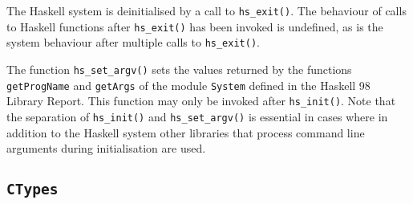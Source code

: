 \documentclass[a4paper,twoside]{article}
\newcommand{\code}[1]{\texttt{#1}}      %
\begin{document}
The Haskell system is deinitialised by a call to \code{hs\_exit()}.  The
behaviour of calls to Haskell functions after \code{hs\_exit()} has been
invoked is undefined, as is the system behaviour after multiple calls to
\code{hs\_exit()}. 

The function \code{hs\_set\_argv()} sets the values returned by the functions
\code{getProgName} and \code{getArgs} of the module \code{System} defined in
the Haskell 98 Library Report.  This function may only be invoked after
\code{hs\_init()}.  Note that the separation of \code{hs\_init()} and
\code{hs\_set\_argv()} is essential in cases where in addition to the Haskell
system other libraries that process command line arguments during
initialisation are used.

\subsection{\code{CTypes}}
\label{sec:CTypes}
\end{document}

